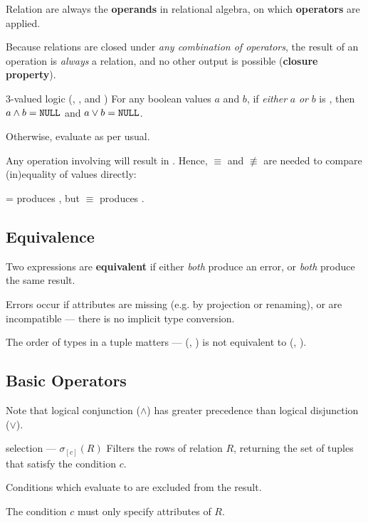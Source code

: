 Relation are always the \textbf{operands} in relational algebra, on which \textbf{operators} are applied.

Because relations are closed under \textit{any combination of operators}, the result of an operation is \textit{always} a relation, and no other output is possible (\textbf{closure property}).

\begin{defn}{3-valued logic (, , and )}
    For any boolean values $a$ and $b$, if \textit{either} $a$ \textit{or} $b$ is , then $a \land b = \texttt{NULL}$ and $a \lor b = \texttt{NULL}$.

    Otherwise, evaluate as per usual.

    Any operation involving  will result in .
    Hence, $\equiv$ and $\not\equiv$ are needed to compare (in)equality of  values directly:

     =  produces , but  $\equiv$  produces .
\end{defn}

\subsection{Equivalence}
Two expressions are \textbf{equivalent} if either \textit{both} produce an error, or \textit{both} produce the same result.

Errors occur if attributes are missing (e.g. by projection or renaming), or
are incompatible --- there is no implicit type conversion.

The order of types in a tuple matters --- (, ) is not equivalent to (, ).

\subsection{Basic Operators}
Note that logical conjunction ($\land$) has greater precedence than logical disjunction ($\lor$).

\begin{defn}{selection --- $\sigma_{[c]}(R)$}
    Filters the rows of relation $R$, returning the set of tuples that satisfy the condition $c$.

    Conditions which evaluate to  are excluded from the result.

    The condition $c$ must only specify attributes of $R$.
\end{defn}

